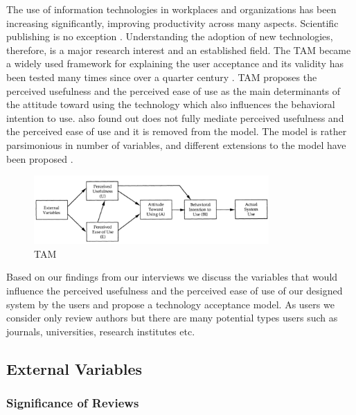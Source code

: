 The use of information technologies in workplaces and organizations has been increasing significantly, improving productivity across many aspects. Scientific publishing is no exception \parencite[132]{Ware.2015}. Understanding the adoption of new technologies, therefore, is a major research interest and an established field. The \acrlong{TAM} \parencite{Davis.1985, Davis.1989, Davis.1989b} became a widely used framework for explaining the user acceptance and its validity has been tested many times since over a quarter century \parencite{Marangunic.2015}. \acrshort{TAM} proposes the perceived usefulness and the perceived ease of use as the main determinants of the attitude toward using the technology which also influences the behavioral intention to use. \cite{Davis.1989b} also found out does not fully mediate perceived usefulness and the
perceived ease of use and it is removed from the model. The model is rather parsimonious in number of variables, and different extensions to the model have been proposed \parencite{Marangunic.2015}. 

\begin{figure}[htpb]
  \centering
  \includegraphics[width=0.8\textwidth]{figures/TAM.png}
  \caption{\acrlong{TAM} \parencite{Davis.1989b} } \label{fig:tam}
\end{figure}

Based on our findings from our interviews we discuss the variables that would influence the perceived usefulness and the perceived ease of use of our designed system by the users and propose a technology acceptance model. As users we consider only review authors but there are many potential types users such as journals, universities, research institutes etc. 

\subsection{External Variables}

\subsubsection{Significance of Reviews}

